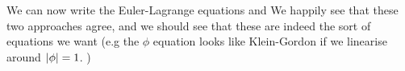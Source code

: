 \documentclass{article}
\begin{document}
We can now write the Euler-Lagrange equations 
and 
We happily see that these two approaches agree, and we should see that these are indeed the sort of equations we want (e.g the $\phi$ equation looks like Klein-Gordon if we linearise around $\left\lvert \phi \right\rvert=1$. )
\end{document}
